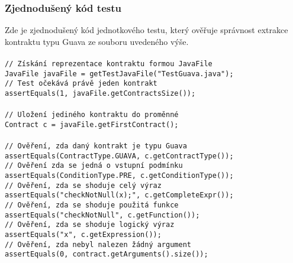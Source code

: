 			\subsubsection{Zjednodušený kód testu}
				Zde je zjednodušený kód jednotkového testu, který ověřuje správnost extrakce kontraktu typu Guava ze souboru uvedeného výše.\\\\
				\- \- \- \- \- \- \texttt{\textcolor{pgrey}{// Získání reprezentace kontraktu formou JavaFile}}\\ 
				\- \- \- \- \- \- \texttt{JavaFile javaFile = getTestJavaFile("TestGuava.java");}\\
				\- \- \- \- \- \- \texttt{\textcolor{pgrey}{// Test očekává právě jeden kontrakt}}\\ 
				\- \- \- \- \- \- \texttt{assertEquals(1, javaFile.getContractsSize());}\\\\
				\- \- \- \- \- \- \texttt{\textcolor{pgrey}{// Uložení jediného kontraktu do proměnné}}\\ 
				\- \- \- \- \- \- \texttt{Contract c = javaFile.getFirstContract();}\\\\
				\- \- \- \- \- \- \texttt{\textcolor{pgrey}{// Ověření, zda daný kontrakt je typu Guava}}\\
				\- \- \- \- \- \- \texttt{assertEquals(ContractType.GUAVA, c.getContractType());}\\
				\- \- \- \- \- \- \texttt{\textcolor{pgrey}{// Ověření zda se jedná o vstupní podmínku}}\\
				\- \- \- \- \- \- \texttt{assertEquals(ConditionType.PRE, c.getConditionType());}\\
				\- \- \- \- \- \- \texttt{\textcolor{pgrey}{// Ověření, zda se shoduje celý výraz}}\\
				\- \- \- \- \- \- \texttt{assertEquals("checkNotNull(x);", c.getCompleteExpr());}\\
				\- \- \- \- \- \- \texttt{\textcolor{pgrey}{// Ověření, zda se shoduje použitá funkce}}\\
				\- \- \- \- \- \- \texttt{assertEquals("checkNotNull", c.getFunction());}\\
				\- \- \- \- \- \- \texttt{\textcolor{pgrey}{// Ověření, zda se shoduje logický výraz}}\\
				\- \- \- \- \- \- \texttt{assertEquals("x", c.getExpression());}\\
				\- \- \- \- \- \- \texttt{\textcolor{pgrey}{// Ověření, zda nebyl nalezen žádný argument}}\\
				\- \- \- \- \- \- \texttt{assertEquals(0, contract.getArguments().size());}\\\\
				
